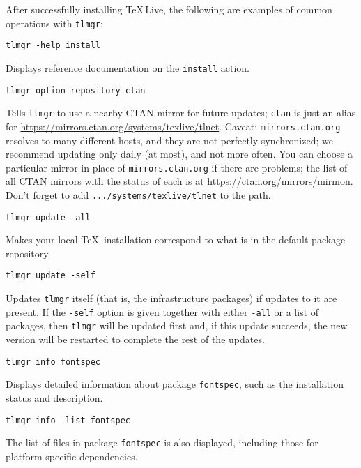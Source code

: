 \documentclass[11pt]{article}
\begin{document}
After successfully installing \TeX\,Live, the following are
examples of common operations with \texttt{tlmgr}:
\begin{description}

\item\texttt{tlmgr -help install}\par

Displays reference documentation on the \texttt{install} action.

\item\texttt{tlmgr option repository ctan}\par 

Tells \texttt{tlmgr} to use a nearby CTAN mirror for
future updates; \texttt{ctan} is just an alias for
\url{https://mirrors.ctan.org/systems/texlive/tlnet}. Caveat:
\texttt{mirrors.ctan.org} resolves to many different
hosts, and they are not perfectly synchronized; we
recommend updating only daily (at most), and not more
often. You can choose a particular mirror in place of
\texttt{mirrors.ctan.org} if there are problems; the
list of all CTAN mirrors with the status of each is at
\url{https://ctan.org/mirrors/mirmon}. Don't forget to add
\texttt{.../systems/texlive/tlnet} to the path.

\item\texttt{tlmgr update -all}\par 

Makes your local \TeX\ installation correspond to what is in
the default package repository.

\item\texttt{tlmgr update -self}\par 

Updates \texttt{tlmgr} itself (that is, the infrastructure
packages) if updates to it are present. If the
\texttt{-self} option is given together with either
\texttt{-all} or a list of packages, then \texttt{tlmgr}
will be updated first and, if this update succeeds, the
new version will be restarted to complete the rest of the
updates.

\item\texttt{tlmgr info fontspec}\par 

Displays detailed information about package
\texttt{fontspec}, such as the installation status and
description.

\item\texttt{tlmgr info -list fontspec}\par 

The list of files in package \texttt{fontspec} is
also displayed, including those for platform-specific
dependencies.


\end{description}
\end{document}
